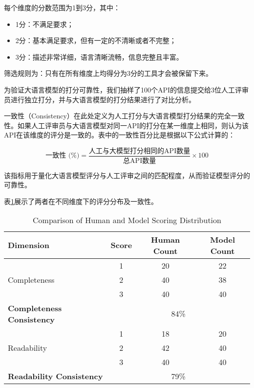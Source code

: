 每个维度的分数范围为1到3分，其中：
\begin{itemize}
    \item 1分：不满足要求；
    \item 2分：基本满足要求，但有一定的不清晰或者不完整；
    \item 3分：描述非常详细，语言清晰流畅，信息完整且丰富。
\end{itemize}

筛选规则为：只有在所有维度上均得分为3分的工具才会被保留下来。

为验证大语言模型的打分可靠性，我们抽样了100个API的信息提交给3位人工评审员进行独立打分，并与大语言模型的打分结果进行了对比分析。

一致性（Consistency）在此处定义为人工打分与大语言模型打分结果的完全一致性。如果人工评审员与大语言模型对同一API的打分在某一维度上相同，则认为该API在该维度的评分是一致的。表中的一致性百分比是根据以下公式计算的：

\[
\text{一致性 (\%)} = \frac{\text{人工与大模型打分相同的API数量}}{\text{总API数量}} \times 100
\]

该指标用于量化大语言模型评分与人工评审之间的匹配程度，从而验证模型评分的可靠性。

表\ref{tab:api_score_comparison}展示了两者在不同维度下的评分分布及一致性。

\begin{table}[h]
  \centering
  \caption{Comparison of Human and Model Scoring Distribution}
  \label{tab:api_score_comparison}
  \begin{tabular}{l|c|c|c}
  \toprule
  \textbf{Dimension} & \textbf{Score} & \textbf{Human Count} & \textbf{Model Count} \\ \midrule
  \multirow{3}{*}{Completeness} & 1 & 20 & 22 \\ 
                                & 2 & 40 & 38 \\ 
                                & 3 & 40 & 40 \\ \hline
  \textbf{Completeness Consistency} & \multicolumn{3}{c}{84\%} \\ \midrule
  \multirow{3}{*}{Readability}  & 1 & 18 & 20 \\ 
                                & 2 & 42 & 40 \\ 
                                & 3 & 40 & 40 \\ \hline
  \textbf{Readability Consistency} & \multicolumn{3}{c}{79\%} \\ 
  \bottomrule
  \end{tabular}
  \end{table}

